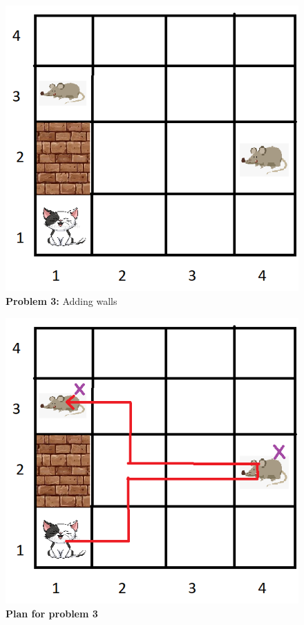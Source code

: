 \begin{multicols}{2}

\begin{figure}[H]
    \centering
    \includegraphics[width=\linewidth]{fig/A3/cat_03.png}
    \caption{\textbf{Problem 3:} Adding walls}
    \label{fig:cat_03}
\end{figure}

\columnbreak

\begin{figure}[H]
    \centering
    \includegraphics[width=\linewidth]{fig/A3/cat_03_sol.png}
    \caption{\textbf{Plan for problem 3}}
    \label{fig:cat_03_sol}
\end{figure}

\end{multicols}

